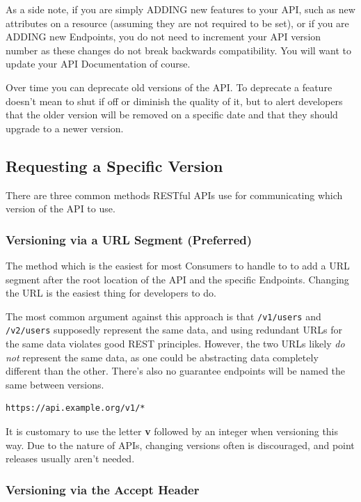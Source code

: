 \documentclass{book}
\begin{document}
As a side note, if you are simply ADDING new features to your API, such as new attributes on a resource (assuming they are not required to be set), or if you are ADDING new Endpoints, you do not need to increment your API version number as these changes do not break backwards compatibility. You will want to update your API Documentation of course.

Over time you can deprecate old versions of the API. To deprecate a feature doesn't mean to shut if off or diminish the quality of it, but to alert developers that the older version will be removed on a specific date and that they should upgrade to a newer version.

\subsection{Requesting a Specific Version}

There are three common methods RESTful APIs use for communicating which version of the API to use.

\subsubsection{Versioning via a URL Segment (Preferred)}

The method which is the easiest for most Consumers to handle to to add a URL segment after the root location of the API and the specific Endpoints. Changing the URL is the easiest thing for developers to do.

The most common argument against this approach is that \texttt{/v1/users} and \texttt{/v2/users} supposedly represent the same data, and using redundant URLs for the same data violates good REST principles. However, the two URLs likely \emph{do not} represent the same data, as one could be abstracting data completely different than the other. There's also no guarantee endpoints will be named the same between versions.

\begin{verbatim}
https://api.example.org/v1/*
\end{verbatim}

It is customary to use the letter \textbf{v} followed by an integer when versioning this way. Due to the nature of APIs, changing versions often is discouraged, and point releases usually aren't needed.

\subsubsection{Versioning via the Accept Header}
\end{document}
